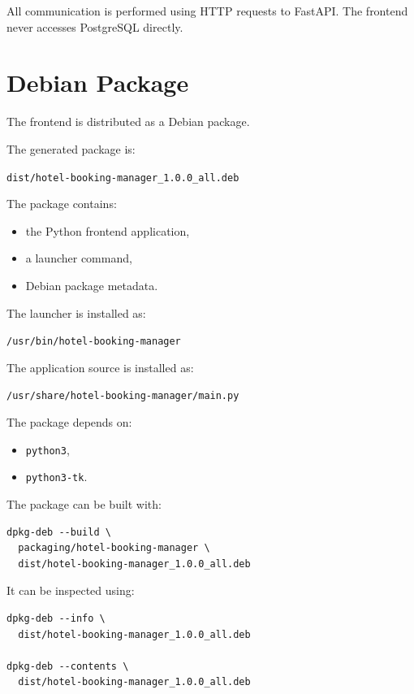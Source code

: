 \documentclass[12pt,a4paper]{article}
\begin{document}
All communication is performed using HTTP requests to FastAPI.
The frontend never accesses PostgreSQL directly.

\section{Debian Package}

The frontend is distributed as a Debian package.

The generated package is:

\begin{center}
\texttt{dist/hotel-booking-manager\_1.0.0\_all.deb}
\end{center}

The package contains:

\begin{itemize}
    \item the Python frontend application,
    \item a launcher command,
    \item Debian package metadata.
\end{itemize}

The launcher is installed as:

\begin{center}
\texttt{/usr/bin/hotel-booking-manager}
\end{center}

The application source is installed as:

\begin{center}
\texttt{/usr/share/hotel-booking-manager/main.py}
\end{center}

The package depends on:

\begin{itemize}
    \item \texttt{python3},
    \item \texttt{python3-tk}.
\end{itemize}

The package can be built with:

\begin{lstlisting}
dpkg-deb --build \
  packaging/hotel-booking-manager \
  dist/hotel-booking-manager_1.0.0_all.deb
\end{lstlisting}

It can be inspected using:

\begin{lstlisting}
dpkg-deb --info \
  dist/hotel-booking-manager_1.0.0_all.deb

dpkg-deb --contents \
  dist/hotel-booking-manager_1.0.0_all.deb
\end{lstlisting}
\end{document}
